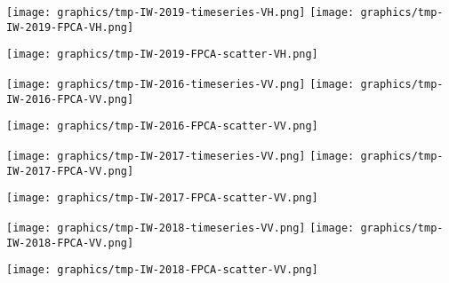 
\begin{center}
\begin{minipage}{7.0in}
\texttt{[image: graphics/tmp-IW-2019-timeseries-VH.png]}
\quad
\texttt{[image: graphics/tmp-IW-2019-FPCA-VH.png]}
\vskip 1.0cm
\begin{center}
\texttt{[image: graphics/tmp-IW-2019-FPCA-scatter-VH.png]}
\end{center}
\end{minipage}
\end{center}


\begin{center}
\begin{minipage}{7.0in}
\texttt{[image: graphics/tmp-IW-2016-timeseries-VV.png]}
\quad
\texttt{[image: graphics/tmp-IW-2016-FPCA-VV.png]}
\vskip 1.0cm
\begin{center}
\texttt{[image: graphics/tmp-IW-2016-FPCA-scatter-VV.png]}
\end{center}
\end{minipage}
\end{center}


\begin{center}
\begin{minipage}{7.0in}
\texttt{[image: graphics/tmp-IW-2017-timeseries-VV.png]}
\quad
\texttt{[image: graphics/tmp-IW-2017-FPCA-VV.png]}
\vskip 1.0cm
\begin{center}
\texttt{[image: graphics/tmp-IW-2017-FPCA-scatter-VV.png]}
\end{center}
\end{minipage}
\end{center}


\begin{center}
\begin{minipage}{7.0in}
\texttt{[image: graphics/tmp-IW-2018-timeseries-VV.png]}
\quad
\texttt{[image: graphics/tmp-IW-2018-FPCA-VV.png]}
\vskip 1.0cm
\begin{center}
\texttt{[image: graphics/tmp-IW-2018-FPCA-scatter-VV.png]}
\end{center}
\end{minipage}
\end{center}

